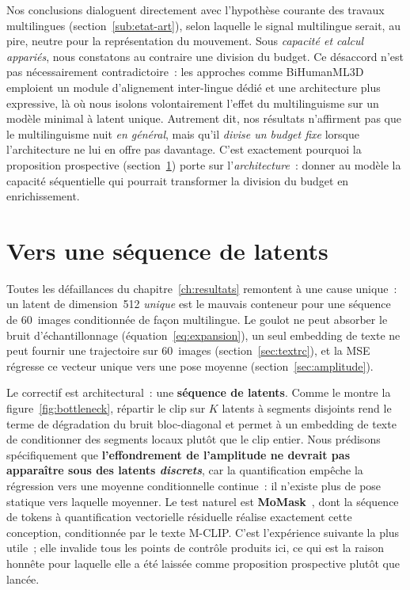 \documentclass[12pt,a4paper,oneside]{report}
\theoremstyle{definition}
\theoremstyle{plain}
\begin{document}
Nos conclusions dialoguent directement avec l'hypothèse courante des travaux
multilingues (section~\ref{sub:etat-art}), selon laquelle le signal multilingue
serait, au pire, neutre pour la représentation du mouvement. Sous \emph{capacité et
calcul appariés}, nous constatons au contraire une division du budget. Ce désaccord
n'est pas nécessairement contradictoire~: les approches comme
BiHumanML3D~\cite{weng2026bihumanml3d} emploient un module d'alignement inter-lingue
dédié et une architecture plus expressive, là où nous isolons volontairement l'effet
du multilinguisme sur un modèle minimal à latent unique. Autrement dit, nos
résultats n'affirment pas que le multilinguisme nuit \emph{en général}, mais qu'il
\emph{divise un budget fixe} lorsque l'architecture ne lui en offre pas davantage.
C'est exactement pourquoi la proposition prospective (section~\ref{sec:forward})
porte sur l'\emph{architecture}~: donner au modèle la capacité séquentielle qui
pourrait transformer la division du budget en enrichissement.

\section{Vers une séquence de latents}
\label{sec:forward}

Toutes les défaillances du chapitre~\ref{ch:resultats} remontent à une cause
unique~: un latent de dimension~512 \emph{unique} est le mauvais conteneur pour une
séquence de 60~images conditionnée de façon multilingue. Le goulot ne peut
absorber le bruit d'échantillonnage (équation~\eqref{eq:expansion}), un seul
embedding de texte ne peut fournir une trajectoire sur 60~images
(section~\ref{sec:textrc}), et la MSE régresse ce vecteur unique vers une pose
moyenne (section~\ref{sec:amplitude}).

Le correctif est architectural~: une \textbf{séquence de latents}. Comme le montre
la figure~\ref{fig:bottleneck}, répartir le clip sur $K$ latents à segments
disjoints rend le terme de dégradation du bruit bloc-diagonal et permet à un
embedding de texte de conditionner des segments locaux plutôt que le clip entier.
Nous prédisons spécifiquement que \textbf{l'effondrement de l'amplitude ne devrait
pas apparaître sous des latents \emph{discrets}}, car la quantification empêche la
régression vers une moyenne conditionnelle continue~: il n'existe plus de pose
statique vers laquelle moyenner. Le test naturel est \textbf{MoMask}~\cite{guo2024momask},
dont la séquence de tokens à quantification vectorielle résiduelle réalise
exactement cette conception, conditionnée par le texte M-CLIP. C'est l'expérience
suivante la plus utile~; elle invalide tous les points de contrôle produits ici,
ce qui est la raison honnête pour laquelle elle a été laissée comme proposition
prospective plutôt que lancée.
\end{document}
